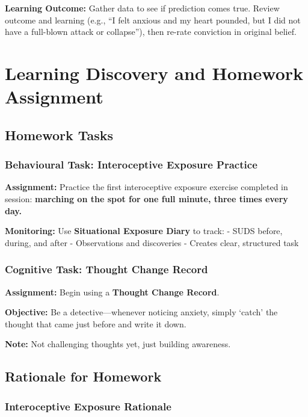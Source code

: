 \documentclass[
  american,
  11pt,
  11pt,
  letterpaper,
  onecolumn]{article}
\begin{document}
\textbf{Learning Outcome:} Gather data to see if prediction comes true.
Review outcome and learning (e.g., ``I felt anxious and my heart
pounded, but I did not have a full-blown attack or collapse''), then
re-rate conviction in original belief.

\section{Learning Discovery and Homework
Assignment}\label{learning-discovery-and-homework-assignment}

\subsection{Homework Tasks}\label{homework-tasks}

\subsubsection{Behavioural Task: Interoceptive Exposure
Practice}\label{behavioural-task-interoceptive-exposure-practice}

\textbf{Assignment:} Practice the first interoceptive exposure exercise
completed in session: \textbf{marching on the spot for one full minute,
three times every day.}

\textbf{Monitoring:} Use \textbf{Situational Exposure Diary} to track: -
SUDS before, during, and after - Observations and discoveries - Creates
clear, structured task

\subsubsection{Cognitive Task: Thought Change
Record}\label{cognitive-task-thought-change-record}

\textbf{Assignment:} Begin using a \textbf{Thought Change Record}.

\textbf{Objective:} Be a detective---whenever noticing anxiety, simply
`catch' the thought that came just before and write it down.

\textbf{Note:} Not challenging thoughts yet, just building awareness.

\subsection{Rationale for Homework}\label{rationale-for-homework}

\subsubsection{Interoceptive Exposure
Rationale}\label{interoceptive-exposure-rationale}
\end{document}
